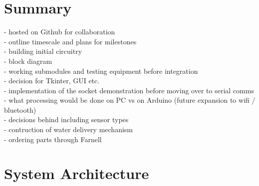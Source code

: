 \documentclass[a4paper,11pt]{article}
\begin{document}
\section{Summary}
\label{sec:Summary}
- hosted on Github for collaboration \\
- outline timescale and plans for milestones\\
- building initial circuitry\\
- block diagram\\
- working submodules and testing equipment before integration\\
- decision for Tkinter, GUI etc.\\
- implementation of the socket demonstration before moving over to serial comms \\
- what processing would be done on PC vs on Arduino (future expansion to wifi / bluetooth)\\
- decisions behind including sensor types \\
- contruction of water delivery mechanism\\
- ordering parts through Farnell

\begin{table}[H]
    \centering
    \caption{Component Order Summary}
    \label{tab:component_order}
\end{table}

\section{System Architecture}
\label{sec:System_Architecture}
\end{document}
